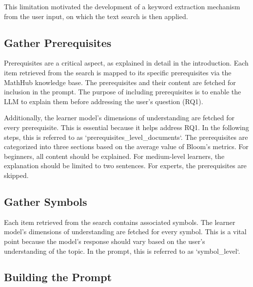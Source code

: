 This limitation motivated the development of a keyword extraction mechanism from the user input, on which the text search
is then applied.

\subsection{Gather Prerequisites}

Prerequisites are a critical aspect, as explained in detail in the introduction. Each item retrieved from the search is mapped to its specific prerequisites via the MathHub knowledge base. The
prerequisites and their content are fetched for inclusion in the prompt. The purpose of including prerequisites is to enable the LLM to explain them before addressing the user's question (RQ1).

Additionally, the learner model's dimensions of understanding are fetched for every prerequisite. This is essential because it helps address RQ1.
In the following steps, this is referred to as `prerequisites\_level\_documents`.
The prerequisites are categorized into three sections based on the average value of Bloom's metrics. For beginners, all content should be explained. For medium-level learners, the explanation should be limited to two sentences. For experts, the prerequisites are skipped.
\subsection{Gather Symbols}
Each item retrieved from the search contains associated symbols.
The learner model's dimensions of understanding are fetched for every symbol.
This is a vital point because the model's response should vary based on the user's understanding of the topic.
In the prompt, this is referred to as `symbol\_level`.

\subsection{Building the Prompt}

